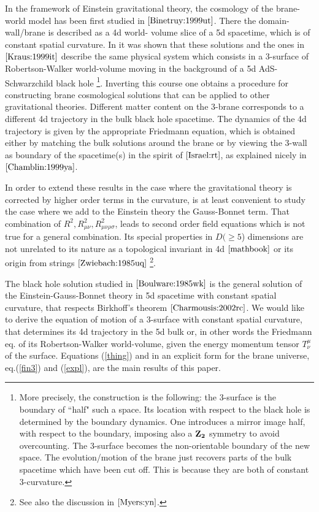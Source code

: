 \documentclass[a4paper,a4paper]{article}
\begin{document}
In the framework of Einstein gravitational theory, the cosmology of the brane-world model
has been first studied in $\cite{Binetruy:1999ut}$. There the domain-wall/brane 
 is described as a 4d world-
volume slice of a 5d spacetime, which is of constant spatial curvature.  In \cite{Mukohyama:1999wi}
it was shown that these solutions and the ones in $\cite{Kraus:1999it}$ 
 describe the same physical system which consists in a 3-surface 
of Robertson-Walker world-volume moving in the background of a 5d AdS-Schwarzchild black hole
\footnote{More precisely, the construction is the following:
 the 3-surface is the boundary of ``half" such a space. Its location
with respect to the black hole is determined by the boundary dynamics.
One introduces a mirror image half, with respect to the
boundary, imposing also a ${\bf Z_2}$ symmetry to avoid overcounting. The 3-surface
becomes the non-orientable boundary of the new space. The evolution/motion of
the brane just
 recovers parts of the bulk spacetime which have
been cut off. This is because they are both of constant 3-curvature.}. Inverting 
this course one obtains a procedure 
for constructing brane cosmological solutions
that can be applied to
other gravitational theories.  Different
matter content on the 3-brane corresponds to a different 4d trajectory in the bulk black hole spacetime.
The dynamics of the 4d trajectory is given by the appropriate Friedmann equation, which
is obtained either by matching the bulk solutions around the brane or by viewing the
3-wall as boundary of the spacetime(s) in the spirit of $\cite{Israel:rt}$, as explained
nicely in $\cite{Chamblin:1999ya}$.

In order to extend these results in the case where 
the gravitational theory is corrected by  higher order terms in the curvature, 
is at least convenient to
study the case where we add to the Einstein theory the Gauss-Bonnet term. That combination
of  $R^2, R^2_{\mu\nu},R^2_{\mu\nu\rho\sigma}$,
 leads to second order 
field equations which is not true for a general 
combination. Its special properties in $D(\geq 5$) dimensions
are not unrelated to its nature as a topological invariant in 
4d $\cite{mathbook}$ or its origin from strings $\cite{Zwiebach:1985uq}$ 
\footnote{See also the discussion in $\cite{Myers:yn}$.}.

The black hole solution studied in $\cite{Boulware:1985wk}$ is the general solution
of the Einstein-Gauss-Bonnet theory in 5d spacetime with constant spatial curvature,
that respects Birkhoff's theorem $\cite{Charmousis:2002rc}$. We would like to derive
the equation of motion of a 3-surface with constant spatial curvature, that determines
its 4d trajectory in the 5d bulk or, in other words the Friedmann eq. of its Robertson-Walker
world-volume, given the energy momentum tensor $T^{\mu}_{\nu}$ of the surface. Equations
(\ref{thing}) and in an explicit form for the brane universe, eq.(\ref{fin3}) and
(\ref{expl}), are the main
results of this paper.
\end{document}
